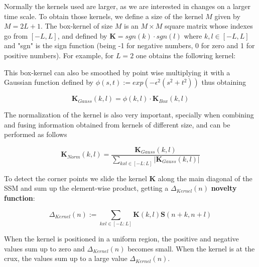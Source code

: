 \documentclass[a4paper, 9pt, twocolumn]{extarticle}
\begin{document}
Normally the kernels used are larger, as we are interested in changes on a larger time scale. To obtain those kernels, we define a size of the kernel $M$ given by $M=2L+1$. The box-kernel of size $M$ is an $M\times M$ square matrix whose indexes go from $[-L,L]$, and defined by $\textbf{K}=sgn(k)·sgn(l)$ where $k,l\in[-L,L]$ and "sgn" is the sign function (being -1 for negative numbers, 0 for zero and 1 for positive numbers). For example, for $L=2$ one obtains the following kernel:


This box-kernel can also be smoothed by point wise multiplying it with a Gaussian function defined by  $\phi(s,t):=exp(-\epsilon^2(s^2+t^2))$ thus obtaining

\[\textbf{K}_{Gauss}(k,l)=\phi(k,l)·\textbf{K}_{Box}(k,l)\]

The normalization of the kernel is also very important, specially when combining and fusing information obtained from kernels of different size, and can be performed as follows

\[\textbf{K}_{Norm}(k,l)=\frac{\textbf{K}_{Gauss}(k,l)}{\sum_{kxl\in[-L:L]}|\textbf{K}_{Gauss}(k,l)|}\]


To detect the corner points we slide the kernel $\textbf{K}$ along the main diagonal of the SSM and sum up the element-wise product, getting a $\Delta_{Kernel}(n)$ \textbf{novelty function}:

\[\Delta_{Kernel}(n):=\sum_{kxl\in[-L:L]}\textbf{K}(k,l)\textbf{S}(n+k, n+l)\]

When the kernel is positioned in a uniform region, the positive and negative values sum up to zero and $\Delta_{Kernel}(n)$ becomes small. When the kernel is at the crux, the values sum up to a large value $\Delta_{Kernel}(n)$. 
\end{document}
